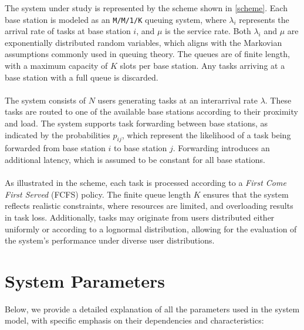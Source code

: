 \documentclass{report}
\begin{document}
The system under study is represented by the scheme shown in \autoref{scheme}. Each base station is modeled as an \texttt{M/M/1/K} queuing system, where $\lambda_i$ represents the arrival rate of tasks at base station $i$, and $\mu$ is the service rate.
Both $\lambda_i$ and $\mu$ are exponentially distributed random variables, which aligns with the Markovian assumptions commonly used in queuing theory.
The queues are of finite length, with a maximum capacity of $K$ slots per base station. Any tasks arriving at a base station with a full queue is discarded.\\\\
The system consists of $N$ users generating tasks at an interarrival rate $\lambda$. These tasks are routed to one of the available base stations according to their proximity and load.
The system supports task forwarding between base stations, as indicated by the probabilities $p_{ij}$, which represent the likelihood of a task being forwarded from base station $i$ to base station $j$.
Forwarding introduces an additional latency, which is assumed to be constant for all base stations.\\\\
As illustrated in the scheme, each task is processed according to a \textit{First Come First Served} (FCFS) policy. 
The finite queue length $K$ ensures that the system reflects realistic constraints, where resources are limited, and overloading results in task loss.
Additionally, tasks may originate from users distributed either uniformly or according to a lognormal distribution, allowing for the evaluation of the system's performance under diverse user distributions.

\section{System Parameters}
Below, we provide a detailed explanation of all the parameters used in the system model, with specific emphasis on their dependencies and characteristics:
\end{document}
